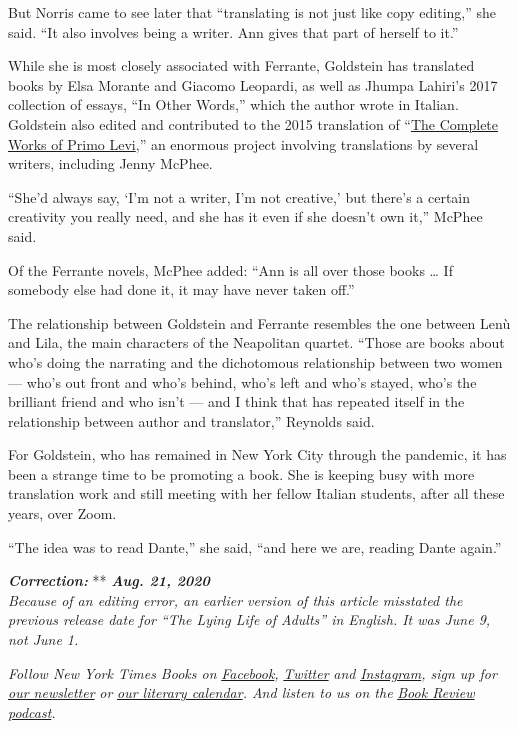 But Norris came to see later that ``translating is not just like copy
editing,'' she said. ``It also involves being a writer. Ann gives that
part of herself to it.''

While she is most closely associated with Ferrante, Goldstein has
translated books by Elsa Morante and Giacomo Leopardi, as well as Jhumpa
Lahiri's 2017 collection of essays, ``In Other Words,'' which the author
wrote in Italian. Goldstein also edited and contributed to the 2015
translation of
``\href{https://www.nytimes3xbfgragh.onion/2015/11/29/books/review/the-complete-works-of-primo-levi.html}{The
Complete Works of Primo Levi},'' an enormous project involving
translations by several writers, including Jenny McPhee.

``She'd always say, `I'm not a writer, I'm not creative,' but there's a
certain creativity you really need, and she has it even if she doesn't
own it,'' McPhee said.

Of the Ferrante novels, McPhee added: ``Ann is all over those books
\ldots{} If somebody else had done it, it may have never taken off.''

The relationship between Goldstein and Ferrante resembles the one
between Lenù and Lila, the main characters of the Neapolitan quartet.
``Those are books about who's doing the narrating and the dichotomous
relationship between two women --- who's out front and who's behind,
who's left and who's stayed, who's the brilliant friend and who isn't
--- and I think that has repeated itself in the relationship between
author and translator,'' Reynolds said.

For Goldstein, who has remained in New York City through the pandemic,
it has been a strange time to be promoting a book. She is keeping busy
with more translation work and still meeting with her fellow Italian
students, after all these years, over Zoom.

``The idea was to read Dante,'' she said, ``and here we are, reading
Dante again.''

\emph{\textbf{Correction:}} ** \emph{\textbf{Aug. 21, 2020}}\\
\emph{Because of an editing error, an earlier version of this article
misstated the previous release date for ``The Lying Life of Adults'' in
English. It was June 9, not June 1.}

\emph{Follow New York Times Books on}
\href{https://www.facebookcorewwwi.onion/nytbooks/}{\emph{Facebook}}\emph{,}
\href{https://twitter.com/nytimesbooks}{\emph{Twitter}} \emph{and}
\href{https://www.instagram.com/nytbooks/}{\emph{Instagram}}\emph{, sign
up for}
\href{https://www.nytimes3xbfgragh.onion/newsletters/books-review}{\emph{our
newsletter}} \emph{or}
\href{https://www.nytimes3xbfgragh.onion/interactive/2017/books/books-calendar.html}{\emph{our
literary calendar}}\emph{. And listen to us on the}
\href{https://www.nytimes3xbfgragh.onion/column/book-review-podcast}{\emph{Book
Review podcast}}\emph{.}

